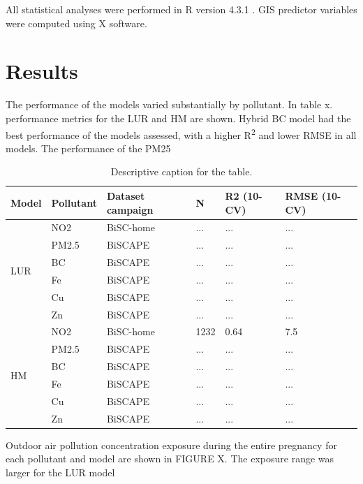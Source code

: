 \documentclass{article}
\begin{document}
All statistical analyses were performed in R version 4.3.1 \cite{Rstudio}. GIS predictor variables were computed using X software. 

\newpage
\section{Results}

The performance of the models varied substantially by pollutant. In table x. performance metrics for the LUR and HM are shown. Hybrid BC model had the best performance of the models assessed, with a higher R\textsuperscript{2} and lower RMSE in all models. The performance of the PM25 

\begin{table}[ht]
\centering
\begin{tabular}{llllll}
\toprule
\textbf{Model} & \textbf{Pollutant} & \textbf{Dataset campaign} & \textbf{N} & \textbf{R2 (10-CV)} & \textbf{RMSE (10-CV)} \\
\midrule
\multirow{6}{*}{LUR} & NO2 & BiSC-home & ... & ... & ... \\
& PM2.5 & BiSCAPE & ... & ... & ... \\
& BC & BiSCAPE & ... & ... & ... \\
& Fe & BiSCAPE & ... & ... & ... \\
& Cu & BiSCAPE & ... & ... & ... \\
& Zn & BiSCAPE & ... & ... & ... \\
\midrule
\multirow{6}{*}{HM} & NO2 & BiSC-home & 1232 & 0.64 & 7.5 \\
& PM2.5 & BiSCAPE & ... & ... & ... \\
& BC & BiSCAPE & ... & ... & ... \\
& Fe & BiSCAPE & ... & ... & ... \\
& Cu & BiSCAPE & ... & ... & ... \\
& Zn & BiSCAPE & ... & ... & ... \\
\bottomrule
\end{tabular}
\caption{Descriptive caption for the table.}
\label{tab:my_label}
\end{table}




Outdoor air pollution concentration exposure during the entire pregnancy for each pollutant and model are shown in FIGURE X. The exposure range was larger for the LUR model
\end{document}
